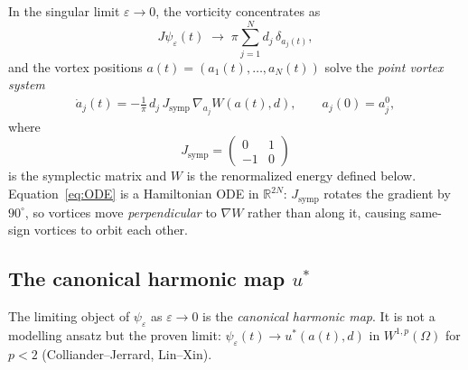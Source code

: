 \documentclass[12pt, a4paper]{article}
\theoremstyle{plain}
\theoremstyle{definition}
\newcommand{\R}{\mathbb{R}}
\newcommand{\psieps}{\psi_\varepsilon}
\newcommand{\symp}{J_{\mathrm{symp}}}
\begin{document}
In the singular limit $\varepsilon \to 0$, the vorticity concentrates as
\[
  J\psieps(t) \;\to\; \pi\sum_{j=1}^N d_j\,\delta_{a_j(t)},
\]
and the vortex positions $a(t) = (a_1(t),\ldots,a_N(t))$ solve the
\emph{point vortex system}
\begin{align}
  \dot{a}_j(t)
  = -\frac{1}{\pi}\,d_j\,\symp\,\nabla_{a_j} W(a(t), d),
  \qquad a_j(0) = a_j^0,
  \label{eq:ODE}
\end{align}
where
\[
  \symp = \begin{pmatrix} 0 & 1 \\ -1 & 0 \end{pmatrix}
\]
is the symplectic matrix and $W$ is the renormalized energy defined below.
Equation~\eqref{eq:ODE} is a Hamiltonian ODE in $\R^{2N}$:
$\symp$ rotates the gradient by $90^\circ$, so vortices move
\emph{perpendicular} to $\nabla W$ rather than along it,
causing same-sign vortices to orbit each other.

\subsection{The canonical harmonic map $u^*$}

The limiting object of $\psieps$ as $\varepsilon \to 0$ is the
\emph{canonical harmonic map}.
It is not a modelling ansatz but the proven limit:
$\psieps(t) \to u^*(a(t),d)$ in $W^{1,p}(\Omega)$ for $p < 2$
(Colliander--Jerrard, Lin--Xin).
\end{document}
